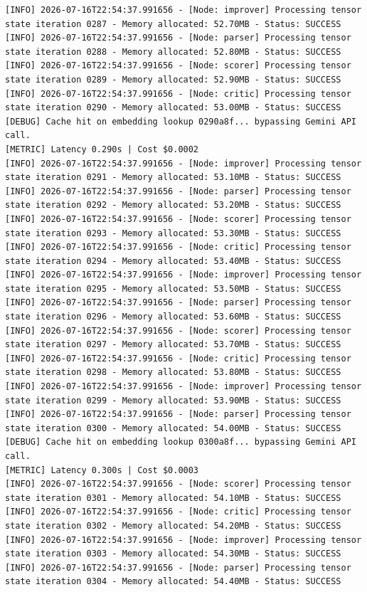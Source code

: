 \documentclass[10pt,journal,compsoc]{IEEEtran}
\begin{document}
\begin{verbatim}
[INFO] 2026-07-16T22:54:37.991656 - [Node: improver] Processing tensor state iteration 0287 - Memory allocated: 52.70MB - Status: SUCCESS
[INFO] 2026-07-16T22:54:37.991656 - [Node: parser] Processing tensor state iteration 0288 - Memory allocated: 52.80MB - Status: SUCCESS
[INFO] 2026-07-16T22:54:37.991656 - [Node: scorer] Processing tensor state iteration 0289 - Memory allocated: 52.90MB - Status: SUCCESS
[INFO] 2026-07-16T22:54:37.991656 - [Node: critic] Processing tensor state iteration 0290 - Memory allocated: 53.00MB - Status: SUCCESS
[DEBUG] Cache hit on embedding lookup 0290a8f... bypassing Gemini API call.
[METRIC] Latency 0.290s | Cost $0.0002
[INFO] 2026-07-16T22:54:37.991656 - [Node: improver] Processing tensor state iteration 0291 - Memory allocated: 53.10MB - Status: SUCCESS
[INFO] 2026-07-16T22:54:37.991656 - [Node: parser] Processing tensor state iteration 0292 - Memory allocated: 53.20MB - Status: SUCCESS
[INFO] 2026-07-16T22:54:37.991656 - [Node: scorer] Processing tensor state iteration 0293 - Memory allocated: 53.30MB - Status: SUCCESS
[INFO] 2026-07-16T22:54:37.991656 - [Node: critic] Processing tensor state iteration 0294 - Memory allocated: 53.40MB - Status: SUCCESS
[INFO] 2026-07-16T22:54:37.991656 - [Node: improver] Processing tensor state iteration 0295 - Memory allocated: 53.50MB - Status: SUCCESS
[INFO] 2026-07-16T22:54:37.991656 - [Node: parser] Processing tensor state iteration 0296 - Memory allocated: 53.60MB - Status: SUCCESS
[INFO] 2026-07-16T22:54:37.991656 - [Node: scorer] Processing tensor state iteration 0297 - Memory allocated: 53.70MB - Status: SUCCESS
[INFO] 2026-07-16T22:54:37.991656 - [Node: critic] Processing tensor state iteration 0298 - Memory allocated: 53.80MB - Status: SUCCESS
[INFO] 2026-07-16T22:54:37.991656 - [Node: improver] Processing tensor state iteration 0299 - Memory allocated: 53.90MB - Status: SUCCESS
[INFO] 2026-07-16T22:54:37.991656 - [Node: parser] Processing tensor state iteration 0300 - Memory allocated: 54.00MB - Status: SUCCESS
[DEBUG] Cache hit on embedding lookup 0300a8f... bypassing Gemini API call.
[METRIC] Latency 0.300s | Cost $0.0003
[INFO] 2026-07-16T22:54:37.991656 - [Node: scorer] Processing tensor state iteration 0301 - Memory allocated: 54.10MB - Status: SUCCESS
[INFO] 2026-07-16T22:54:37.991656 - [Node: critic] Processing tensor state iteration 0302 - Memory allocated: 54.20MB - Status: SUCCESS
[INFO] 2026-07-16T22:54:37.991656 - [Node: improver] Processing tensor state iteration 0303 - Memory allocated: 54.30MB - Status: SUCCESS
[INFO] 2026-07-16T22:54:37.991656 - [Node: parser] Processing tensor state iteration 0304 - Memory allocated: 54.40MB - Status: SUCCESS

\end{verbatim}
\end{document}
